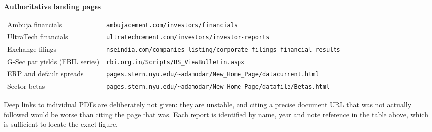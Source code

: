 \vspace{3mm}
{\footnotesize\bfseries\color{navy}Authoritative landing pages}\par\vspace{1.5mm}
{\scriptsize\raggedright
\begin{tabular}{@{}p{}p{}@{}}
Ambuja financials & \texttt{ambujacement.com/investors/financials}\\
UltraTech financials & \texttt{ultratechcement.com/investors/investor-reports}\\
Exchange filings & \texttt{nseindia.com/companies-listing/corporate-filings-financial-results}\\
G-Sec par yields (FBIL series) & \texttt{rbi.org.in/Scripts/BS\_ViewBulletin.aspx}\\
ERP and default spreads & \texttt{pages.stern.nyu.edu/\textasciitilde adamodar/New\_Home\_Page/datacurrent.html}\\
Sector betas & \texttt{pages.stern.nyu.edu/\textasciitilde adamodar/New\_Home\_Page/datafile/Betas.html}\\
\end{tabular}\par
\vspace{1.5mm}
Deep links to individual PDFs are deliberately not given: they are unstable, and citing
a precise document URL that was not actually followed would be worse than citing the
page that was. Each report is identified by name, year and note reference in the table
above, which is sufficient to locate the exact figure.\par}

\clearpage

